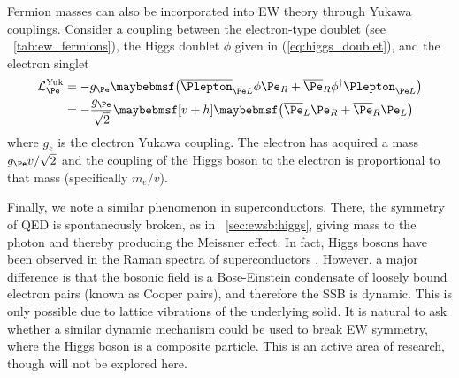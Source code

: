 Fermion masses can also be incorporated into \ac{EW} theory through Yukawa couplings.
Consider a coupling between the electron-type  doublet (see 
\Table~\ref{tab:ew_fermions}), the Higgs doublet $\phi$ given in 
(\ref{eq:higgs_doublet}), and the electron  singlet
\begin{align}
	\mathcal{L}_{\Pe}^{\text{Yuk}} &= -g_{\Pe} \parenths{\overline{\Plepton}_{\Pe L} \phi \Pe_{R} + \overline{\Pe}_{R} \phi^{\dagger} \Plepton_{\Pe L}} \\
	&= -\frac{g_{\Pe}}{\sqrt{2}} \sqbracs{v + h} \parenths{\overline{\Pe}_{L} \Pe_{R} + \overline{\Pe}_{R} \Pe_{L}}
\end{align}
where $g_e$ is the electron Yukawa coupling. The electron has acquired a mass 
$g_{\Pe}v/\sqrt{2}$ and the coupling of the Higgs boson to the electron is proportional 
to that mass (specifically $m_e/v$).

Finally, we note a similar phenomenon in superconductors. There, the  symmetry 
of \ac{QED} is spontaneously broken, as in \Section~\ref{sec:ewsb:higgs}, giving mass to 
the photon and thereby producing the Meissner effect. In fact, Higgs bosons have been 
observed in the Raman spectra of superconductors \cite{Superconductivity}. However, a 
major difference is that the bosonic field is a Bose-Einstein condensate of loosely bound 
electron pairs (known as Cooper pairs), and therefore the \ac{SSB} is dynamic. This is 
only possible due to lattice vibrations of the underlying solid. It is natural to ask 
whether a similar dynamic mechanism could be used to break \ac{EW} symmetry, where the 
Higgs boson is a composite particle. This is an active area of research, though will not 
be explored here.
